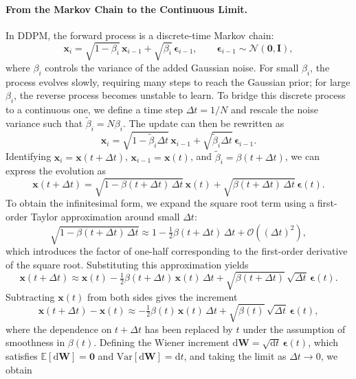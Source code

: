 \paragraph{From the Markov Chain to the Continuous Limit.}
In DDPM, the forward process is a discrete-time Markov chain:
\[
\mathbf{x}_i = \sqrt{1 - \beta_i}\,\mathbf{x}_{i-1} + \sqrt{\beta_i}\,\boldsymbol{\epsilon}_{i-1}, 
\qquad \boldsymbol{\epsilon}_{i-1} \sim \mathcal{N}(\mathbf{0}, \mathbf{I}),
\]
where \(\beta_i\) controls the variance of the added Gaussian noise. 
For small \(\beta_i\), the process evolves slowly, requiring many steps to reach the Gaussian prior; for large \(\beta_i\), the reverse process becomes unstable to learn. 
To bridge this discrete process to a continuous one, we define a time step \(\Delta t = 1/N\) and rescale the noise variance such that \(\tilde{\beta}_i = N\beta_i\). 
The update can then be rewritten as
\[
\mathbf{x}_i 
= \sqrt{1 - \tilde{\beta}_i \Delta t}\,\mathbf{x}_{i-1} 
  + \sqrt{\tilde{\beta}_i \Delta t}\,\boldsymbol{\epsilon}_{i-1}.
\]
Identifying \(\mathbf{x}_i = \mathbf{x}(t+\Delta t)\), \(\mathbf{x}_{i-1} = \mathbf{x}(t)\), and \(\tilde{\beta}_i = \beta(t+\Delta t)\), we can express the evolution as
\[
\mathbf{x}(t+\Delta t) 
= \sqrt{1 - \beta(t+\Delta t)\,\Delta t}\,\mathbf{x}(t)
  + \sqrt{\beta(t+\Delta t)\,\Delta t}\,\boldsymbol{\epsilon}(t).
\]
To obtain the infinitesimal form, we expand the square root term using a first-order Taylor approximation around small \(\Delta t\):
\[
\sqrt{1 - \beta(t+\Delta t)\,\Delta t} 
\approx 1 - \tfrac{1}{2}\beta(t+\Delta t)\,\Delta t + \mathcal{O}((\Delta t)^2),
\]
which introduces the factor of one-half corresponding to the first-order derivative of the square root.  
Substituting this approximation yields
\[
\mathbf{x}(t+\Delta t) 
\approx \mathbf{x}(t) 
  - \tfrac{1}{2}\beta(t+\Delta t)\,\mathbf{x}(t)\,\Delta t 
  + \sqrt{\beta(t+\Delta t)}\,\sqrt{\Delta t}\,\boldsymbol{\epsilon}(t).
\]
Subtracting \(\mathbf{x}(t)\) from both sides gives the increment
\[
\mathbf{x}(t+\Delta t) - \mathbf{x}(t)
\approx -\tfrac{1}{2}\beta(t)\,\mathbf{x}(t)\,\Delta t
        + \sqrt{\beta(t)}\,\sqrt{\Delta t}\,\boldsymbol{\epsilon}(t),
\]
where the dependence on \(t+\Delta t\) has been replaced by \(t\) under the assumption of smoothness in \(\beta(t)\).
Defining the Wiener increment \(\mathrm{d}\mathbf{W} = \sqrt{\mathrm{d}t}\,\boldsymbol{\epsilon}(t)\),
which satisfies \(\mathbb{E}[\mathrm{d}\mathbf{W}] = \mathbf{0}\) and \(\mathrm{Var}[\mathrm{d}\mathbf{W}] = \mathrm{d}t\),
and taking the limit as \(\Delta t \to 0\), we obtain
